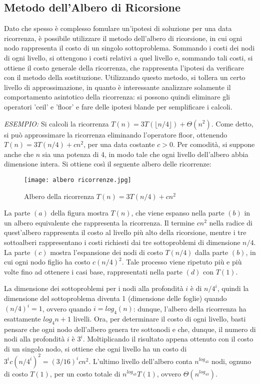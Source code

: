 \subsection{Metodo dell'Albero di Ricorsione}
Dato che spesso è complesso fomulare un'ipotesi di soluzione per una data ricorrenza, è possibile utilizzare il metodo dell'albero di ricorsione, in cui ogni nodo rappresenta il costo di un singolo sottoproblema. Sommando i costi dei nodi di ogni livello, si ottengono i costi relativi a quel livello e, sommando tali costi, si ottiene il costo generale della ricorrenza, che rappresenta l'ipotesi da verificare con il metodo della sostituzione. Utilizzando questo metodo, si tollera un certo livello di approssimazione, in quanto è interessante analizzare solamente il comportamento asintotico della ricorrenza: si possono quindi eliminare gli operatori 'ceil' e 'floor' e fare delle ipotesi blande per semplificare i calcoli.

\textit{ESEMPIO:} Si calcoli la ricorrenza \(T(n)=3T(\lfloor n/4 \rfloor)+\Theta(n^2)\). Come detto, si può approssimare la ricorrenza eliminando l'operatore floor, ottenendo \(T(n)=3T(n/4)+cn^2\), per una data costante \(c>0\). Per comodità, si suppone anche che \(n\) sia una potenza di 4, in modo tale che ogni livello dell'albero abbia dimensione intera. Si ottiene così il seguente albero delle ricorrenze:

\begin{figure}[!h]
  \centering
  \texttt{[image: albero ricorrenze.jpg]}
  \caption{Albero della ricorrenza \(T(n)=3T(n/4)+cn^2\)}
\end{figure}

La parte \((a)\) della figura mostra \(T(n)\), che viene espanso nella parte \((b)\) in un albero equivalente che rappresenta la ricorrenza. Il termine \(cn^2\) nella radice di quest'albero rappresenta il costo al livello più alto della ricorsione, mentre i tre sottoalberi rappresentano i costi richiesti dai tre sottoproblemi di dimensione \(n/4\). La parte \((c)\) mostra l'espansione dei nodi di costo \(T(n/4)\) dalla parte \((b)\), in cui ogni nodo figlio ha costo \(c(n/4)^2\). Tale processo viene ripetuto più e più volte fino ad ottenere i casi base, rappresentati nella parte \((d)\) con \(T(1)\). 

La dimensione dei sottoproblemi per i nodi alla profondità \(i\) è di \(n/4^i\), quindi la dimensione del sottoproblema diventa 1 (dimensione delle foglie) quando \((n/4)^i=1\), ovvero quando \(i=log_4(n)\): dunque, l'albero della ricorrenza ha esattamente \(log_4n+1\) livelli. Ora, per determinare il costo di ogni livello, basti pensare che ogni nodo dell'albero genera tre sottonodi e che, dunque, il numero di nodi alla profondità \(i\) è \(3^i\). Moltiplicando il risultato appena ottenuto con il costo di un singolo nodo, si ottiene che ogni livello ha un costo di \(3^ic(n/4^i)^2 = (3/16)^icn^2\). L'ultimo livello dell'albero conta \(n^{log_43}\) nodi, ognuno di costo \(T(1)\), per un costo totale di \(n^{log_43}T(1)\), ovvero \(\Theta(n^{log_43})\).

